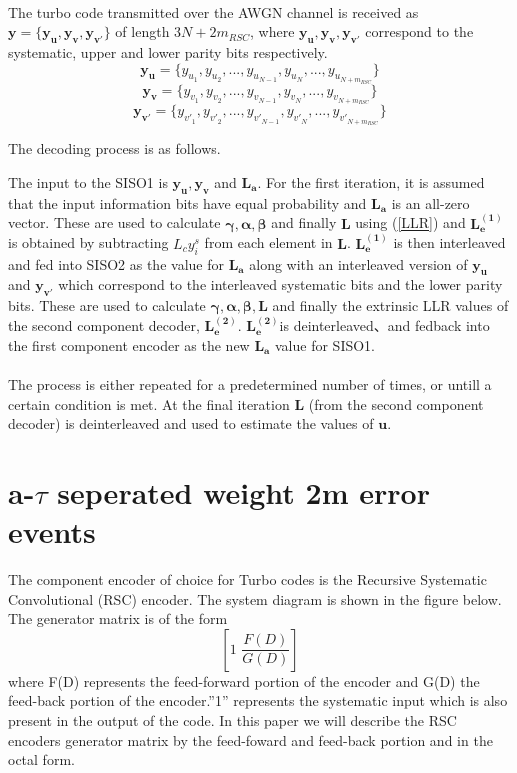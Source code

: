 \documentclass[20 pts]{article}
\begin{document}
 \paragraph{}
 The turbo code transmitted over the AWGN channel is received as
  $\mathbf{y}=\{\mathbf{y_u},\mathbf{y_v},\mathbf{y_{v'}} \}$ of length 
  $3N +2m_{RSC}$, where $\mathbf{y_u},\mathbf{y_v},\mathbf{y_{v'}}$
    correspond to the systematic, upper and lower parity bits respectively.
    $$\mathbf{y_u}=\{y_{u_1}, y_{u_2},...,y_{u_{N-1}}, y_{u_N} ,...,y_{u_{N+m_{RSC}}}\}$$ 
     $$\mathbf{y_v}=\{y_{v_1}, y_{v_2},...,y_{v_{N-1}}, y_{v_N} ,...,y_{v_{N+m_{RSC}}}\}$$
      $$\mathbf{y_{v'}}=\{y_{{v'}_1}, y_{{v'}_2},...,y_{{v'}_{N-1}}, y_{{v'}_N},...,y_{{v'}_{N+m_{RSC}}} \}$$ 
    
  The decoding process is as follows.
  

The input to the SISO1 is $\mathbf{y_u},\mathbf{y_v}$ and $\mathbf{L_a}$. 
For the first iteration, it is assumed 
that the input information bits have equal probability and $\mathbf{L_a}$ is an 
all-zero vector.
These are used to calculate $\boldsymbol{\gamma },\boldsymbol{\alpha} , 
\boldsymbol{\beta} $
 and finally
$\mathbf{L}$ using (\ref{LLR}) and $\mathbf{L_e^{(1)}}$ is obtained by subtracting
 $L_cy_i^s$  from each element in $\mathbf{L}$.
$\mathbf{L_e^{(1)}}$ is then
 interleaved and fed into SISO2 as the value for
 $\mathbf{L_a}$ along with an interleaved version of $\mathbf{y_u}$ and 
 $ \mathbf{y_{v'}}$ which correspond to
 the interleaved systematic bits and the lower parity bits. These are used to calculate 
 $\boldsymbol{\gamma },\boldsymbol{\alpha} , 
\boldsymbol{\beta},\mathbf{L}$
 and finally the extrinsic LLR values 
of the second component decoder, $\mathbf{L_e^{(2)}}$.
$\mathbf{L_e^{(2)}}$is deinterleaved、and fedback into the first component encoder
 as the new $\mathbf{L_a}$ value for SISO1.
\paragraph{}
The process is either repeated for a predetermined number of times, or untill a certain 
condition is met. At the final iteration $\mathbf{L}$ (from the second component
 decoder) is deinterleaved and used to estimate the values of $\mathbf{u}$.

\section{a-$\tau$ seperated weight 2m error events}
The component encoder of choice for Turbo codes is the Recursive Systematic 
Convolutional (RSC) encoder. The system diagram is shown in the figure below. The
generator matrix is of the form 
$$[1\,  \, \frac{F(D)}{G(D)}]$$ where F(D) represents the 
feed-forward portion of the encoder and G(D) the feed-back portion of the encoder.''1''
represents the systematic input which is also present in the output of the code. In this 
paper we will describe the RSC encoders generator matrix by the feed-foward and 
feed-back portion and in the  octal form.
\end{document}
